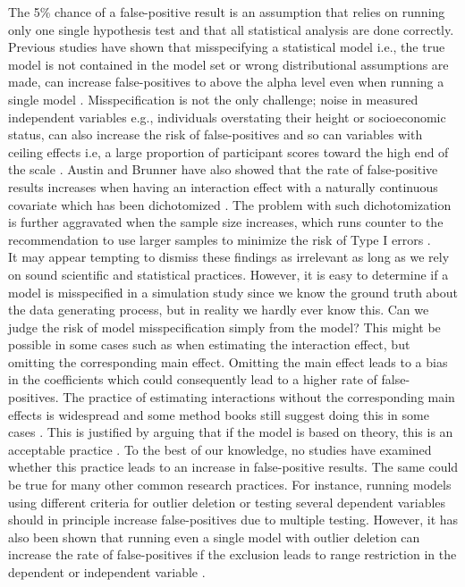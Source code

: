 The 5\% chance of a false-positive result is an assumption that relies on running only one single hypothesis test and that all statistical analysis are done correctly. Previous studies have shown that misspecifying a statistical model i.e., the true model is not contained in the model set or wrong distributional assumptions are made, can increase false-positives to above the alpha level even when running a single model \citep{Dennis2019,Litiere2007}. Misspecification is not the only challenge; noise in measured independent variables e.g., individuals overstating their height or socioeconomic status, can also increase the risk of false-positives \citep{Brunner2009} and so can variables with ceiling effects i.e, a large proportion of participant scores toward the high end of the scale \citep{Austin2003}. Austin and Brunner have also showed that the rate of false-positive results increases when having an interaction effect with a naturally continuous covariate which has been dichotomized \citep{Austin2004}. The problem with such dichotomization is further aggravated when the sample size increases, which runs counter to the recommendation to use larger samples to minimize the risk of Type I errors \citep{simmons2018}. 
\\
It may appear tempting to dismiss these findings as irrelevant as long as we rely on sound scientific and statistical practices. However, it is easy to determine if a model is misspecified in a simulation study since we know the ground truth about the data generating process, but in reality we hardly ever know this. Can we judge the risk of model misspecification simply from the model? This might be possible in some cases such as when estimating the interaction effect, but omitting the corresponding main effect. Omitting the main effect leads to a bias in the coefficients \citep{Branbor2006} which could consequently lead to a higher rate of false-positives. The practice of estimating interactions without the corresponding main effects is widespread \citep{Branbor2006} and some method books still suggest doing this in some cases \citep{Cleves2008}. This is justified by arguing that if the model is based on theory, this is an acceptable practice \citep{aiken1991multiple}. To the best of our knowledge, no studies have examined whether this practice leads to an increase in false-positive results. The same could be true for many other common research practices. For instance, running models using different criteria for outlier deletion or testing several dependent variables should in principle increase false-positives due to multiple testing. However, it has also been shown that running even a single model with outlier deletion can increase the rate of false-positives if the exclusion leads to range restriction in the dependent or independent variable \citep{Raju2003}. \\        

